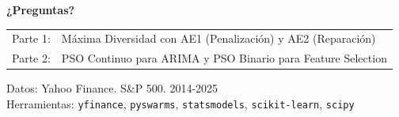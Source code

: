\documentclass[aspectratio=169]{beamer}
\begin{document}
\begin{frame}[plain]
  \vfill
  \begin{center}
    {\Large \textbf{¿Preguntas?}}

    \vspace{20pt}
    {\normalsize
      \begin{tabular}{rl}
        Parte 1: & Máxima Diversidad con AE1 (Penalización) y AE2 (Reparación) \\
        Parte 2: & PSO Continuo para ARIMA y PSO Binario para Feature Selection \\
      \end{tabular}
    }

    \vspace{20pt}
    {\small
      Datos: Yahoo Finance. S\&P 500. 2014-2025 \\
      Herramientas: \texttt{yfinance}, \texttt{pyswarms}, \texttt{statsmodels},
      \texttt{scikit-learn}, \texttt{scipy}
    }
  \end{center}
  \vfill
\end{frame}
\end{document}
